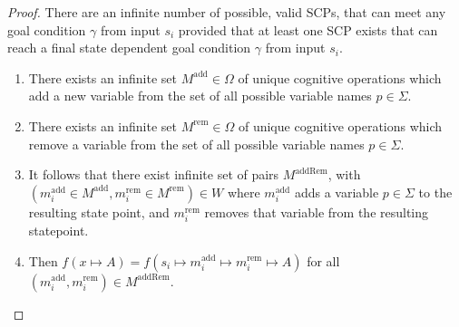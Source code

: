\begin{proof} \label{proof:infiniteSCPs}
There are an infinite number of possible, valid SCPs, that can meet any goal condition $\gamma$ from input $s_i$ provided that at least one SCP exists that can reach a final state dependent goal condition $\gamma$ from input $s_i$.
\begin{enumerate}
\item There exists an infinite set  $M^\text{add} \in \Omega$ of unique cognitive operations which add a new variable from the set of all possible variable names $p \in \Sigma$.
\item There exists an infinite set $M^\text{rem} \in \Omega$ of unique cognitive operations  which remove a variable from the set of all possible variable names  $p \in \Sigma$.
\item It follows that there exist infinite set of pairs $M^\text{addRem}$, with $(m^\text{add}_i \in M^\text{add}, m^\text{rem}_i \in M^\text{rem}) \in W$ where $m^\text{add}_i$ adds a variable $p \in \Sigma$ to the resulting state point, and $m^\text{rem}_i$ removes that variable from the resulting statepoint.
\item Then $f(x \longmapsto A) = f(s_i \longmapsto m^\text{add}_i \longmapsto m^\text{rem}_i \longmapsto A)$ for all $(m^\text{add}_i, m^\text{rem}_i) \in M^\text{addRem}$.
\end{enumerate}
\end{proof}






















